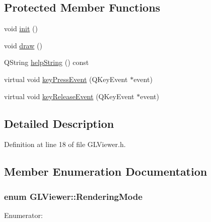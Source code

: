 \subsection*{Protected Member Functions}
\begin{DoxyCompactItemize}
\item 
void \hyperlink{class_g_l_viewer_afcc998ee4646a261742b6a70d5827cb1}{init} ()
\item 
void \hyperlink{class_g_l_viewer_ae24326f0acdd4c6ff8b3b97ec863be85}{draw} ()
\item 
QString \hyperlink{class_g_l_viewer_a4d4be1953913ec2025cf856c12c9f506}{helpString} () const 
\item 
virtual void \hyperlink{class_g_l_viewer_adb67ff4742ee4aca60688c3cf0f05b13}{keyPressEvent} (QKeyEvent $\ast$event)
\item 
virtual void \hyperlink{class_g_l_viewer_a654e84b5ce36c34da9f93859afb964b9}{keyReleaseEvent} (QKeyEvent $\ast$event)
\end{DoxyCompactItemize}


\subsection{Detailed Description}


Definition at line 18 of file GLViewer.h.



\subsection{Member Enumeration Documentation}
\hypertarget{class_g_l_viewer_ae1added1addae5cd67c55931bf9f4cea}{
\subsubsection[{RenderingMode}]{\setlength{\rightskip}{0pt plus 5cm}enum {\bf GLViewer::RenderingMode}}}
\label{class_g_l_viewer_ae1added1addae5cd67c55931bf9f4cea}
\begin{Desc}
\item[Enumerator: ]\par
\begin{description}
\item[{\em 
\hypertarget{class_g_l_viewer_ae1added1addae5cd67c55931bf9f4ceaac5113eebea585439fcd768b6044c17aa}{
Flat}
\label{class_g_l_viewer_ae1added1addae5cd67c55931bf9f4ceaac5113eebea585439fcd768b6044c17aa}
}]\item[{\em 
\hypertarget{class_g_l_viewer_ae1added1addae5cd67c55931bf9f4ceaa71da216e75efdb35c2ee7d0ccea57ef4}{
Smooth}
\label{class_g_l_viewer_ae1added1addae5cd67c55931bf9f4ceaa71da216e75efdb35c2ee7d0ccea57ef4}
}]\end{description}
\end{Desc}



